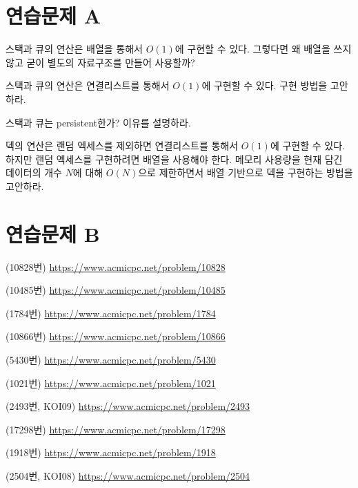 \section{연습문제 A}
\begin{problem}
    스택과 큐의 연산은 배열을 통해서 $O(1)$에 구현할 수 있다. 그렇다면 왜 배열을 쓰지 않고 굳이 별도의 자료구조를 만들어 사용할까?
\end{problem}
\begin{problem}
    스택과 큐의 연산은 연결리스트를 통해서 $O(1)$에 구현할 수 있다. 구현 방법을 고안하라.
\end{problem}
\begin{problem}
    스택과 큐는 persistent한가? 이유를 설명하라.
\end{problem}
\begin{problem}
    덱의 연산은 랜덤 엑세스를 제외하면 연결리스트를 통해서 $O(1)$에 구현할 수 있다. 하지만 랜덤 엑세스를 구현하려면 배열을 사용해야 한다. 메모리 사용량을 현재 담긴 데이터의 개수 $N$에 대해 $O(N)$으로 제한하면서 배열 기반으로 덱을 구현하는 방법을 고안하라.
\end{problem}

\section{연습문제 B}
\begin{problem}
    (10828번) \url{https://www.acmicpc.net/problem/10828}
\end{problem}
\begin{problem}
    (10485번) \url{https://www.acmicpc.net/problem/10485}
\end{problem}
\begin{problem}
    (1784번) \url{https://www.acmicpc.net/problem/1784}
\end{problem}
\begin{problem}
    (10866번) \url{https://www.acmicpc.net/problem/10866}
\end{problem}
\begin{problem}
    (5430번) \url{https://www.acmicpc.net/problem/5430}
\end{problem}
\begin{problem}
    (1021번) \url{https://www.acmicpc.net/problem/1021}
\end{problem}
\begin{problem}
    (2493번, KOI09) \url{https://www.acmicpc.net/problem/2493}
\end{problem}
\begin{problem}
    (17298번) \url{https://www.acmicpc.net/problem/17298}
\end{problem}
\begin{problem}
    (1918번) \url{https://www.acmicpc.net/problem/1918}
\end{problem}
\begin{problem}
    (2504번, KOI08) \url{https://www.acmicpc.net/problem/2504}
\end{problem}

